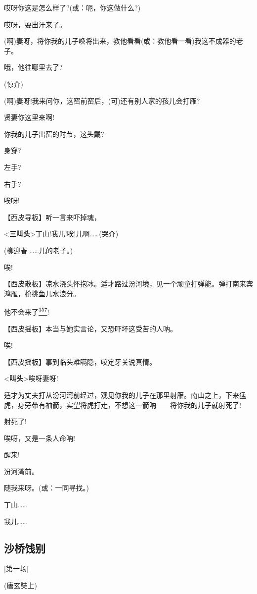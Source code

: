 哎呀你这是怎么样了?(或：呃，你这做什么?)

哎呀，耍出汗来了。

(啊)妻呀，将你我的儿子唤将出来，教他看看(或：教他看一看)我这不成器的老子。

哦，他往哪里去了?

(惊介)

(啊)妻呀!我来问你，这窑前窑后，(可)还有别人家的孩儿会打雁?

贤妻你这里来啊!

你我的儿子出窑的时节，这头戴?

身穿?

左手?

右手?

唉呀!

【西皮导板】听一言来吓掉魂，

\textless{}\textbf{三叫头}\textgreater{}丁山!我儿!唉!儿啊\ldots{}\ldots{}(哭介)

(柳迎春 \ldots{}\ldots{}儿的老子。)

唉!

【西皮散板】凉水浇头怀抱冰。适才路过汾河境，见一个顽童打弹能。弹打南来宾鸿雁，枪挑鱼儿水浪分。

他不会来了\protect\hyperlink{fn357}{\textsuperscript{357}}!

【西皮摇板】本当与她实言论，又恐吓坏这受苦的人呐。

唉!

【西皮摇板】事到临头难瞒隐，咬定牙关说真情。

\textless{}\textbf{叫头}\textgreater{}唉呀妻呀!

适才为丈夫打从汾河湾前经过，观见你我的儿子在那里射雁。南山之上，下来猛虎，身旁带有袖箭，实望将虎打走，不想这一箭呐------将你我的儿子就射死了!

射死了!

唉呀，又是一条人命呐!

醒来!

汾河湾前。

随我来呀。(或：一同寻找。)

丁山\ldots{}\ldots{}

我儿\ldots{}\ldots{}

\hypertarget{ux6c99ux6865ux996fux522b}{%
\subsection{沙桥饯别}\label{ux6c99ux6865ux996fux522b}}

{[}第一场{]}

(唐玄奘上)


